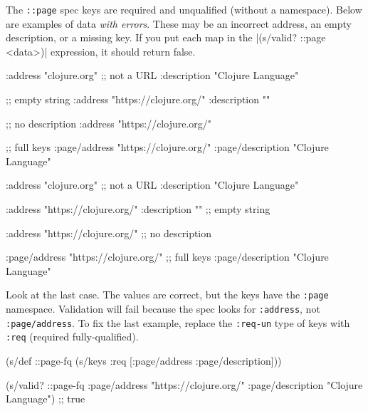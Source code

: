 The \verb|::page| spec keys are required and unqualified (without a namespace). Below are examples of data \emph{with errors}. These may be an incorrect address, an empty description, or a missing key. If you put each map in the \spverb|(s/valid? ::page <data>)| expression, it should return false. 

\ifx\DEVICETYPE\MOBILE

\begin{english}
  \begin{clojure}
{:address "clojure.org" ;; not a URL
 :description "Clojure Language"}

;; empty string
{:address "https://clojure.org/"
 :description ""}

;; no description
{:address "https://clojure.org/"}

 ;; full keys
{:page/address "https://clojure.org/"
 :page/description "Clojure Language"}
  \end{clojure}
\end{english}

\else

\begin{english}
  \begin{clojure}
{:address "clojure.org" ;; not a URL
 :description "Clojure Language"}

{:address "https://clojure.org/"
 :description ""} ;; empty string

{:address "https://clojure.org/"} ;; no description

{:page/address "https://clojure.org/" ;; full keys
 :page/description "Clojure Language"}
  \end{clojure}
\end{english}

\fi

Look at the last case. The values are correct, but the keys have the \verb|:page| namespace. Validation will fail because the spec looks for \verb|:address|, not \verb|:page/address|. To fix the last example, replace the \verb|:req-un| type of keys with \verb|:req| (required fully-qualified).


\ifx\DEVICETYPE\MOBILE

\begin{english}
  \begin{clojure}
(s/def ::page-fq
  (s/keys :req [:page/address
                :page/description]))

(s/valid? ::page-fq
  {:page/address "https://clojure.org/"
   :page/description "Clojure Language"})
;; true
  \end{clojure}
\end{english}

